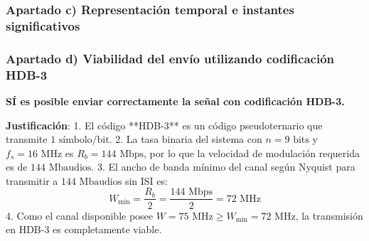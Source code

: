 \begin{resolucion}
\subsubsection*{Apartado c) Representación temporal e instantes significativos}


\subsubsection*{Apartado d) Viabilidad del envío utilizando codificación HDB-3}

\textbf{SÍ es posible enviar correctamente la señal con codificación HDB-3.}

\textbf{Justificación}:
1. El código **HDB-3** es un código pseudoternario que transmite $1\text{ símbolo/bit}$.
2. La tasa binaria del sistema con $n = 9\text{ bits}$ y $f_s = 16\text{ MHz}$ es $R_b = 144\text{ Mbps}$, por lo que la velocidad de modulación requerida es de $144\text{ Mbaudios}$.
3. El ancho de banda mínimo del canal según Nyquist para transmitir a $144\text{ Mbaudios}$ sin ISI es:
   \[
   W_{\text{mín}} = \frac{R_b}{2} = \frac{144\text{ Mbps}}{2} = 72\text{ MHz}
   \]
4. Como el canal disponible posee $W = 75\text{ MHz} \ge W_{\text{mín}} = 72\text{ MHz}$, la transmisión en HDB-3 es completamente viable.
\end{resolucion}

